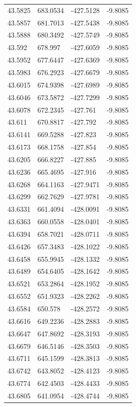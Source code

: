 \begin{table}[H]
\begin{tabular}{llll}
43.5825 & 683.0534 & -427.5128 & -9.8085 \\
43.5857 & 681.7013 & -427.5438 & -9.8085 \\
43.5888 & 680.3492 & -427.5749 & -9.8085 \\
43.592 & 678.997 & -427.6059 & -9.8085 \\
43.5952 & 677.6447 & -427.6369 & -9.8085 \\
43.5983 & 676.2923 & -427.6679 & -9.8085 \\
43.6015 & 674.9398 & -427.6989 & -9.8085 \\
43.6046 & 673.5872 & -427.7299 & -9.8085 \\
43.6078 & 672.2345 & -427.761 & -9.8085 \\
43.611 & 670.8817 & -427.792 & -9.8085 \\
43.6141 & 669.5288 & -427.823 & -9.8085 \\
43.6173 & 668.1758 & -427.854 & -9.8085 \\
43.6205 & 666.8227 & -427.885 & -9.8085 \\
43.6236 & 665.4695 & -427.916 & -9.8085 \\
43.6268 & 664.1163 & -427.9471 & -9.8085 \\
43.6299 & 662.7629 & -427.9781 & -9.8085 \\
43.6331 & 661.4094 & -428.0091 & -9.8085 \\
43.6363 & 660.0558 & -428.0401 & -9.8085 \\
43.6394 & 658.7021 & -428.0711 & -9.8085 \\
43.6426 & 657.3483 & -428.1022 & -9.8085 \\
43.6458 & 655.9945 & -428.1332 & -9.8085 \\
43.6489 & 654.6405 & -428.1642 & -9.8085 \\
43.6521 & 653.2864 & -428.1952 & -9.8085 \\
43.6552 & 651.9323 & -428.2262 & -9.8085 \\
43.6584 & 650.578 & -428.2572 & -9.8085 \\
43.6616 & 649.2236 & -428.2883 & -9.8085 \\
43.6647 & 647.8692 & -428.3193 & -9.8085 \\
43.6679 & 646.5146 & -428.3503 & -9.8085 \\
43.6711 & 645.1599 & -428.3813 & -9.8085 \\
43.6742 & 643.8052 & -428.4123 & -9.8085 \\
43.6774 & 642.4503 & -428.4433 & -9.8085 \\
43.6805 & 641.0954 & -428.4744 & -9.8085 \\

\end{tabular}
\end{table}
